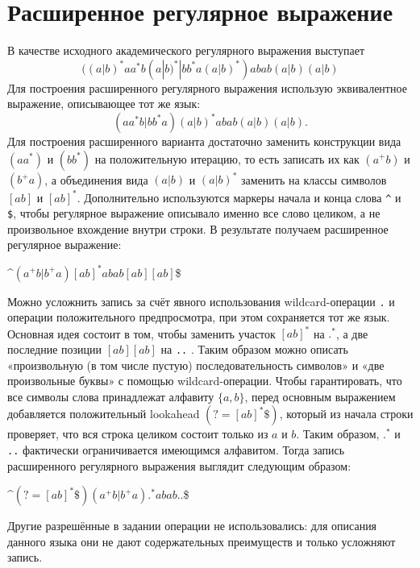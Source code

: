 \documentclass[12pt,a4paper]{article}
\begin{document}
\section*{Расширенное регулярное выражение}
В качестве исходного академического регулярного выражения выступает 
\[
((a|b)^{*}aa^{*}b(a|b)^{*}|bb^{*}a(a|b)^{*})abab(a|b)(a|b)
\]
Для построения расширенного регулярного выражения использую эквивалентное выражение, описывающее тот же язык: 
\[
(aa^{*}b|bb^{*}a)(a|b)^{*}abab(a|b)(a|b).
\]
Для построения расширенного варианта достаточно заменить конструкции вида $(aa^{*})$ и $(bb^{*})$ на положительную итерацию, то есть записать их как $(a^{+}b)$ и $(b^{+}a)$, а объединения вида $(a|b)$ и $(a|b)^{*}$ заменить на классы символов $[ab]$ и $[ab]^{*}$. Дополнительно используются маркеры начала и конца слова \verb!^! и \verb!$!, чтобы регулярное выражение описывало именно все слово целиком, а не произвольное вхождение внутри строки. В результате получаем расширенное регулярное выражение:

\begin{center}
\^{}$(a^{+}b|b^{+}a)[ab]^{*}abab[ab][ab]$\$
\end{center}

Можно усложнить запись за счёт явного использования wildcard-операции \texttt{.} и операции положительного предпросмотра, при этом сохраняется тот же язык. Основная идея состоит в том, чтобы заменить участок $[ab]^{*}$ на $.^{*}$, а две последние позиции $[ab][ab]$ на \texttt{..} . Таким образом можно описать «произвольную (в том числе пустую) последовательность символов» и «две произвольные буквы» с помощью wildcard-операции. Чтобы гарантировать, что все символы слова принадлежат алфавиту $\{a,b\}$, перед основным выражением добавляется положительный lookahead $(?=[ab]^{*}\$)$, который из начала строки проверяет, что вся строка целиком состоит только из $a$ и $b$. Таким образом, $.^{*}$ и \texttt{..} фактически ограничивается имеющимся алфавитом. Тогда запись расширенного регулярного выражения выглядит следующим образом:

\begin{center}
\^{}$(?=[ab]^{*}\$)(a^{+}b|b^{+}a).^{*}abab..$\$
\end{center}

Другие разрешённые в задании операции не использовались: для описания данного языка они не дают содержательных преимуществ и только усложняют запись.
\end{document}
